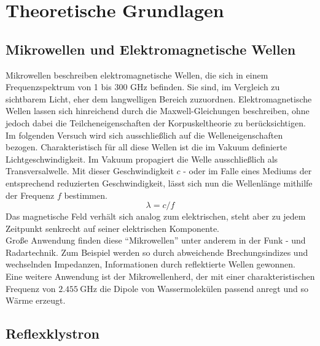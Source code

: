 \section{Theoretische Grundlagen}

\subsection{Mikrowellen und Elektromagnetische Wellen }
Mikrowellen beschreiben elektromagnetische Wellen, die sich in einem Frequenzspektrum von 1 bis 300 $\si{\giga\hertz}$ befinden. 
Sie sind, im Vergleich zu sichtbarem Licht, eher dem langwelligen Bereich zuzuordnen.
Elektromagnetische Wellen lassen sich hinreichend durch die Maxwell-Gleichungen beschreiben, ohne jedoch dabei die Teilcheneigenschaften der Korpuskeltheorie zu berücksichtigen. Im folgenden Versuch wird sich ausschließlich auf die Welleneigenschaften bezogen.
Charakteristisch für all diese Wellen ist die im Vakuum definierte Lichtgeschwindigkeit. Im Vakuum propagiert die Welle ausschließlich als Transversalwelle.
Mit dieser Geschwindigkeit $c$ - oder im Falle eines Mediums der entsprechend reduzierten Geschwindigkeit, lässt sich nun die Wellenlänge mithilfe der Frequenz $f$ bestimmen.
\begin{equation}
    \label{eqn:1}
\lambda = c/f
\end{equation}
Das magnetische Feld verhält sich analog zum elektrischen, steht aber zu jedem Zeitpunkt senkrecht auf seiner elektrischen Komponente. \\
\newline
Große Anwendung finden diese \enquote{Mikrowellen} unter anderem in der Funk - und Radartechnik. Zum Beispiel werden so durch abweichende Brechungsindizes und wechselnden Impedanzen,  Informationen durch reflektierte Wellen gewonnen. 
Eine weitere Anwendung ist der Mikrowellenherd, der mit einer charakteristischen Frequenz von $\SI{2.455}{\giga\hertz}$ die Dipole von Wassermolekülen passend anregt und so Wärme erzeugt.

\subsection{Reflexklystron}

